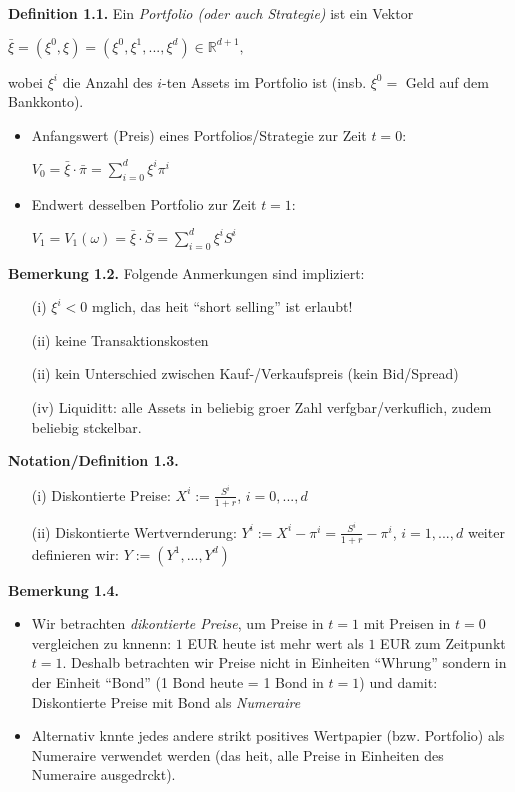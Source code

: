 \documentclass[envcountsame,envcountchap,envcountsect,amsart]{svmono}
\begin{document}
\textbf{Definition 1.1.} Ein \textit{Portfolio (oder auch Strategie)} ist ein Vektor
\begin{center}
$\bar{\xi}=\left(\xi^0,\xi\right)=\left(\xi^0,\xi^1,...,\xi^d\right)\in \mathds{R}^{d+1},$
\end{center}
wobei $\xi^i$ die Anzahl des $i$-ten Assets im Portfolio ist (insb. $\xi^0=$ Geld auf dem Bankkonto).
\begin{itemize}
	\item Anfangswert (Preis) eines Portfolios/Strategie zur Zeit $t=0$:
	\begin{center}
	$V_0=\bar{\xi}\cdot \bar{\pi}=\sum_{i=0}^d{\xi^i\pi^i}$
	\end{center}
	\item Endwert desselben Portfolio zur Zeit $t=1$:
	\begin{center}
	$V_1=V_1\left(\omega\right)=\bar{\xi}\cdot\bar{S}=\sum_{i=0}^d{\xi^iS^i}$
	\end{center}
\end{itemize}
	\textbf{Bemerkung 1.2.} Folgende Anmerkungen sind impliziert:
\begin{enumerate}
	\item[(i)]   $\xi^i<0$ mglich, das heit "`short selling"' ist erlaubt!\vspace*{.1cm}
	\item[(ii)]  keine Transaktionskosten\vspace*{.1cm}
	\item[(ii)]  kein Unterschied zwischen Kauf-/Verkaufspreis (kein Bid/Spread)\vspace*{.1cm}
	\item[(iv)]  Liquiditt: alle Assets in beliebig groer Zahl verfgbar/verkuflich, zudem beliebig stckelbar.
\end{enumerate}
\textbf{Notation/Definition 1.3.}
\begin{enumerate}
	\item[(i)] Diskontierte Preise: $X^i:=\frac{S^i}{1+r}$, $i=0,...,d$
	\item[(ii)] Diskontierte Wertvernderung: $Y^i:=X^i-\pi^i=\frac{S^i}{1+r}-\pi^i$, $i=1,...,d$ weiter definieren wir: $Y:=\left(Y^1,...,Y^d\right)$
\end{enumerate}
\textbf{Bemerkung 1.4.}
\begin{itemize}
	\item Wir betrachten \textit{dikontierte Preise}, um Preise in $t=1$ mit Preisen in $t=0$ vergleichen zu knnenn: $1$ EUR heute ist mehr wert als $1$ EUR zum Zeitpunkt $t=1$. Deshalb betrachten wir Preise nicht in Einheiten "`Whrung"' sondern in der Einheit "`Bond"' (1 Bond heute = 1 Bond in $t=1$) und damit: Diskontierte Preise mit Bond als \textit{Numeraire}
	\item Alternativ knnte jedes andere strikt positives Wertpapier (bzw. Portfolio) als Numeraire verwendet werden (das heit, alle Preise in Einheiten des Numeraire ausgedrckt).
	\end{itemize}
\end{document}
